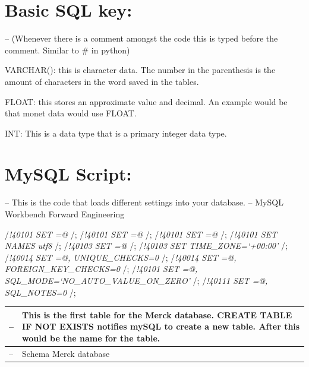 \documentclass[]{book}
\begin{document}
\hypertarget{basic-sql-key}{%
\section{Basic SQL key:}\label{basic-sql-key}}

-- (Whenever there is a comment amongst the code this is typed before the comment. Similar to \# in python)

VARCHAR(): this is character data. The number in the parenthesis is the amount of characters in the word saved in the tables.

FLOAT: this stores an approximate value and decimal. An example would be that monet data would use FLOAT.

INT: This is a data type that is a primary integer data type.

\hypertarget{mysql-script}{%
\section{MySQL Script:}\label{mysql-script}}

-- This is the code that loads different settings into your database.
-- MySQL Workbench Forward Engineering

/\emph{!40101 SET \citet{OLD_CHARACTER_SET_CLIENT}=@\citet{CHARACTER_SET_CLIENT} }/;
/\emph{!40101 SET \citet{OLD_CHARACTER_SET_RESULTS}=@\citet{CHARACTER_SET_RESULTS} }/;
/\emph{!40101 SET \citet{OLD_COLLATION_CONNECTION}=@\citet{COLLATION_CONNECTION} }/;
/\emph{!40101 SET NAMES utf8 }/;
/\emph{!40103 SET \citet{OLD_TIME_ZONE}=@\citet{TIME_ZONE} }/;
/\emph{!40103 SET TIME\_ZONE=`+00:00' }/;
/\emph{!40014 SET \citet{OLD_UNIQUE_CHECKS}=@\citet{UNIQUE_CHECKS}, UNIQUE\_CHECKS=0 }/;
/\emph{!40014 SET \citet{OLD_FOREIGN_KEY_CHECKS}=@\citet{FOREIGN_KEY_CHECKS}, FOREIGN\_KEY\_CHECKS=0 }/;
/\emph{!40101 SET \citet{OLD_SQL_MODE}=@\citet{SQL_MODE}, SQL\_MODE=`NO\_AUTO\_VALUE\_ON\_ZERO' }/;
/\emph{!40111 SET \citet{OLD_SQL_NOTES}=@\citet{SQL_NOTES}, SQL\_NOTES=0 }/;

\begin{longtable}[]{@{}ll@{}}
\toprule
-- & This is the first table for the Merck database. CREATE TABLE IF NOT EXISTS notifies mySQL to create a new table. After this would be the name for the table.\tabularnewline
\midrule
\endhead
-- & Schema Merck database\tabularnewline
\bottomrule
\end{longtable}
\end{document}
